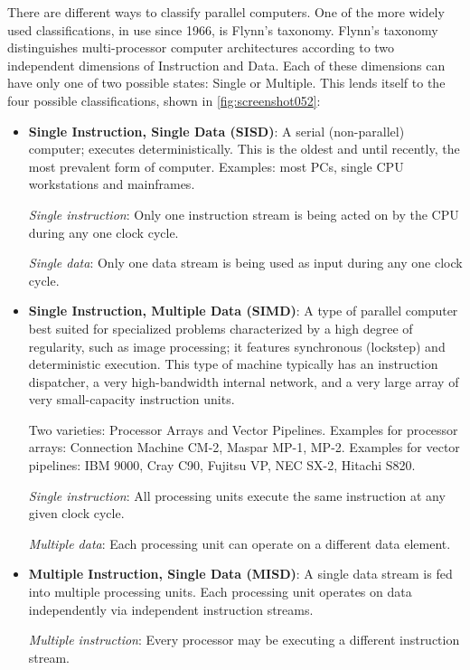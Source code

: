 There are different ways to classify parallel computers. One of the more widely used classifications, in use since 1966, is Flynn's taxonomy.  Flynn's taxonomy distinguishes multi-processor computer architectures according to two independent dimensions of Instruction and Data. Each of these dimensions can have only one of two possible states: Single or Multiple.  This lends itself to the four possible classifications, shown in \autoref{fig:screenshot052}:
\begin{itemize}
\item \textbf{Single Instruction, Single Data (SISD)}: A serial (non-parallel) computer; executes deterministically. This is the oldest and until recently, the most prevalent form of computer. Examples: most PCs, single CPU workstations and mainframes.

\textit{Single instruction}: Only one instruction stream is being acted on by the CPU during any one clock cycle. 

\textit{Single data}: Only one data stream is being used as input during any one clock cycle. 

\item \textbf{Single Instruction, Multiple Data (SIMD)}: A type of parallel computer best suited for specialized problems characterized by a high degree of regularity, such as image processing; it features synchronous (lockstep) and deterministic execution. This type of machine typically has an instruction dispatcher, a very high-bandwidth internal network, and a very large array of very small-capacity instruction units.

Two varieties: Processor Arrays and Vector Pipelines. Examples for processor arrays: Connection Machine CM-2, Maspar MP-1, MP-2. Examples for vector pipelines: IBM 9000, Cray C90, Fujitsu VP, NEC SX-2, Hitachi S820.

\textit{Single instruction}: All processing units execute the same instruction at any given clock cycle.

\textit{Multiple data}: Each processing unit can operate on a different data element.

\item \textbf{Multiple Instruction, Single Data (MISD)}: A single data stream is fed into multiple processing units. Each processing unit operates on data independently via independent instruction streams. 

\textit{Multiple instruction}: Every processor may be executing a different instruction stream.


\end{itemize}
